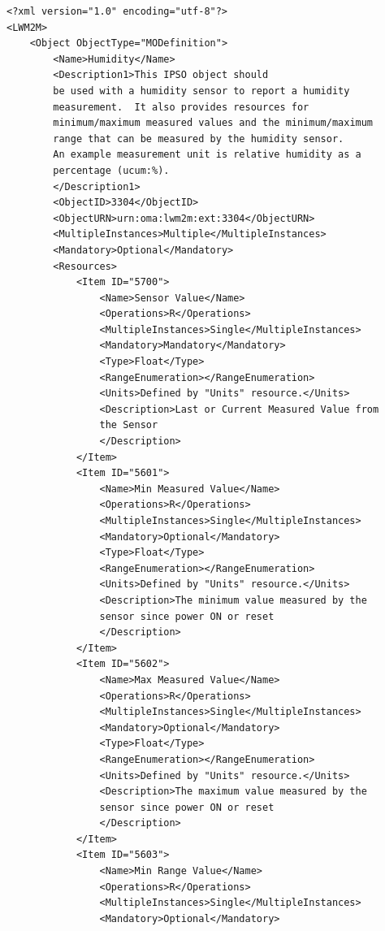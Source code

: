 \documentclass[peerreview, a4paper, 7pt]{IEEEtran}
\begin{document}
\begin{verbatim}
<?xml version="1.0" encoding="utf-8"?>
<LWM2M>
    <Object ObjectType="MODefinition">
        <Name>Humidity</Name>
        <Description1>This IPSO object should 
        be used with a humidity sensor to report a humidity 
        measurement.  It also provides resources for 
        minimum/maximum measured values and the minimum/maximum 
        range that can be measured by the humidity sensor. 
        An example measurement unit is relative humidity as a 
        percentage (ucum:%).
        </Description1>
        <ObjectID>3304</ObjectID>
        <ObjectURN>urn:oma:lwm2m:ext:3304</ObjectURN>
        <MultipleInstances>Multiple</MultipleInstances>
        <Mandatory>Optional</Mandatory>
        <Resources>
            <Item ID="5700">
                <Name>Sensor Value</Name>
                <Operations>R</Operations>
                <MultipleInstances>Single</MultipleInstances>
                <Mandatory>Mandatory</Mandatory>
                <Type>Float</Type>
                <RangeEnumeration></RangeEnumeration>
                <Units>Defined by "Units" resource.</Units>
                <Description>Last or Current Measured Value from 
                the Sensor
                </Description>
            </Item>
            <Item ID="5601">
                <Name>Min Measured Value</Name>
                <Operations>R</Operations>
                <MultipleInstances>Single</MultipleInstances>
                <Mandatory>Optional</Mandatory>
                <Type>Float</Type>
                <RangeEnumeration></RangeEnumeration>
                <Units>Defined by "Units" resource.</Units>
                <Description>The minimum value measured by the
                sensor since power ON or reset
                </Description>
            </Item>
            <Item ID="5602">
                <Name>Max Measured Value</Name>
                <Operations>R</Operations>
                <MultipleInstances>Single</MultipleInstances>
                <Mandatory>Optional</Mandatory>
                <Type>Float</Type>
                <RangeEnumeration></RangeEnumeration>
                <Units>Defined by "Units" resource.</Units>
                <Description>The maximum value measured by the 
                sensor since power ON or reset
                </Description>
            </Item>
            <Item ID="5603">
                <Name>Min Range Value</Name>
                <Operations>R</Operations>
                <MultipleInstances>Single</MultipleInstances>
                <Mandatory>Optional</Mandatory>

\end{verbatim}
\end{document}

